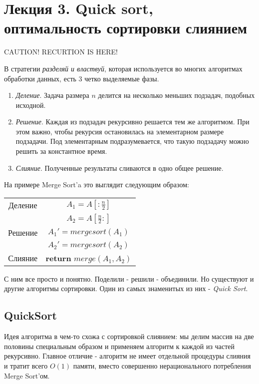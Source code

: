 \documentclass[../book.tex]{subfiles}
\begin{document}
	\section{Лекция 3. Quick sort, оптимальность сортировки слиянием}
	CAUTION! RECURTION IS HERE!
	
	
	В стратегии \textit{разделяй и властвуй}, которая используется во многих алгоритмах обработки данных, есть 3 четко выделяемые фазы.
	\begin{enumerate}
		\item \textit{Деление}. Задача размера $n$ делится на несколько меньших подзадач, подобных исходной.
		
		\item \textit{Решение}. Каждая из подзадач рекурсивно решается тем же алгоритмом. При этом важно, чтобы рекурсия остановилась на элементарном размере подзадачи. Под элементарным подразумевается, что такую подзадачу можно решить за константное время.
		
		\item \textit{Слияние}. Полученные результаты сливаются в одно общее решение.		
	\end{enumerate}
	
	На примере Merge Sort'a это выглядит следующим образом:
	\begin{center}
		\begin{tabular}{c|c}
			Деление &
			$A_1 = A[:\frac{n}{2}]$ \\
			&
			$A_2 = A[\frac{n}{2}:]$
			\\ \hline
			Решение &
			$A_1' = mergesort(A_1)$
			\\
			&
			$A_2' = mergesort(A_2)$
			\\ \hline
			Слияние &
			\textbf{return} $merge(A_1, A_2)$
		\end{tabular}
	\end{center}
	
	С ним все просто и понятно. Поделили - решили - объединили. Но существуют и другие алгоритмы сортировки. Один из самых знаменитых из них - \textit{Quick Sort}.
	
	
	
	\subsection{QuickSort}
	
	Идея алгоритма в чем-то схожа с сортировкой слиянием: мы делим массив на две половины специальным образом и применяем алгоритм к каждой из частей рекурсивно. Главное отличие - алгоритм не имеет отдельной процедуры слияния и тратит всего $O(1)$ памяти, вместо совершенно нерационального потребления Merge Sort'ом.
	
\end{document}
